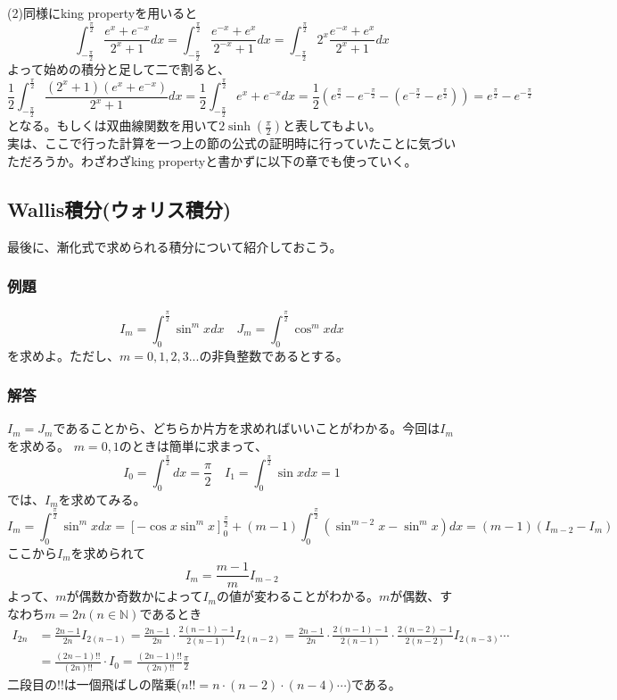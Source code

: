 \documentclass[a4j,dvipdfmx]{jsarticle}
\begin{document}
(2)同様にking propertyを用いると
\begin{equation*}
    \int_{-\frac{\pi}{2}}^\frac{\pi}{2}\frac{e^x+e^{-x}}{2^x+1}dx=\int_{-\frac{\pi}{2}}^{\frac{\pi}{2}}\frac{e^{-x}+e^x}{2^{-x}+1}dx=\int_{-\frac{\pi}{2}}^{\frac{\pi}{2}}2^x\frac{e^{-x}+e^x}{2^{x}+1}dx
\end{equation*}
よって始めの積分と足して二で割ると、
\begin{equation*}
    \frac{1}{2}\int_{-\frac{\pi}{2}}^\frac{\pi}{2} \frac{(2^x+1)(e^x+e^{-x})}{2^x+1}dx=
    \frac{1}{2}\int_{-\frac{\pi}{2}}^\frac{\pi}{2}e^x+e^{-x}dx=\frac{1}{2}(e^{\frac{\pi}{2}}-e^{-\frac{\pi}{2}}-(e^{-\frac{\pi}{2}}-e^{\frac{\pi}{2}}))=e^{\frac{\pi}{2}}-e^{-\frac{\pi}{2}}
\end{equation*}
となる。もしくは双曲線関数を用いて$2\sinh\left(\frac{\pi}{2}\right)$と表してもよい。\\

実は、ここで行った計算を一つ上の節の公式の証明時に行っていたことに気づいただろうか。わざわざking propertyと書かずに以下の章でも使っていく。
\newpage
\subsection{Wallis積分(ウォリス積分)}
最後に、漸化式で求められる積分について紹介しておこう。
\subsubsection*{例題}
\begin{equation*}
    I_m=\int_0^\frac{\pi}{2} \sin^m xdx\quad J_m=\int_0^\frac{\pi}{2}\cos^m xdx
\end{equation*}
を求めよ。ただし、$m=0,1,2,3...$の非負整数であるとする。
\subsubsection*{解答}
$I_m=J_m$であることから、どちらか片方を求めればいいことがわかる。今回は$I_m$を求める。
$m=0,1$のときは簡単に求まって、
\begin{equation*}
    I_0=\int_0^\frac{\pi}{2}dx=\frac{\pi}{2}\quad I_1 =\int_0^\frac{\pi}{2}\sin xdx=1
\end{equation*}
では、$I_{m}$を求めてみる。
\begin{equation*}
    I_{m}=\int_0^\frac{\pi}{2}\sin^{m}xdx=\left[-\cos x\sin^{m} x\right]_0^\frac{\pi}{2}+(m-1)\int_0^\frac{\pi}{2}(\sin^{m-2}x-\sin^m x)dx=(m-1)(I_{m-2}-I_m)
\end{equation*}
ここから$I_m$を求められて
\begin{equation*}
    I_m=\frac{m-1}{m}I_{m-2}
\end{equation*}
よって、$m$が偶数か奇数かによって$I_m$の値が変わることがわかる。$m$が偶数、すなわち$m=2n(n\in\mathbb{N})$であるとき
\begin{align*}
    I_{2n}&=\frac{2n-1}{2n}I_{2(n-1)}=\frac{2n-1}{2n}\cdot\frac{2(n-1)-1}{2(n-1)}I_{2(n-2)}=\frac{2n-1}{2n}\cdot\frac{2(n-1)-1}{2(n-1)}\cdot\frac{2(n-2)-1}{2(n-2)}I_{2(n-3)}\cdots\\
    &=\frac{(2n-1)!!}{(2n)!!}\cdot I_0=\frac{(2n-1)!!}{(2n)!!}\frac{\pi}{2}
\end{align*}
二段目の$!!$は一個飛ばしの階乗($n!!=n\cdot(n-2)\cdot(n-4)\cdots$)である。
\end{document}

